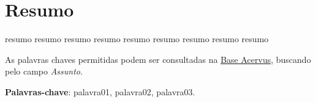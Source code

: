 \chapter*{\centering Resumo}
resumo resumo resumo
resumo resumo resumo
resumo resumo resumo

As palavras chaves permitidas podem ser consultadas na
\href{http://acervus.unicamp.br/}{Base Acervus}, buscando pelo campo
\emph{Assunto}.

\vspace{.5cm}
\textbf{Palavras-chave}:
palavra01, palavra02, palavra03.
